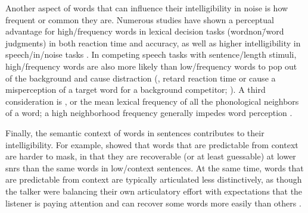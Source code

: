 Another aspect of words that can influence their intelligibility in noise is how frequent or common they are.  Numerous studies have shown a perceptual advantage for high\-/frequency words in lexical decision tasks (word\slsh non\=/word judgments) in both reaction time and accuracy, as well as higher intelligibility in speech\-/in\-/noise tasks \citep[\eg,][]{Howes1957, Savin1963, VitevitchLuce1998, DirksEtAl2001, TakayanagiEtAl2002, VitevitchRodriguez2005}.  In competing speech tasks with sentence\-/length stimuli, high\-/frequency words are also more likely than low\-/frequency words to pop out of the background and cause distraction (\ie, retard reaction time or cause a misperception of a target word for a background competitor; \citealt{BoulengerEtAl2010}).  A third consideration is , or the mean lexical frequency of all the phonological neighbors of a word; a high neighborhood frequency generally impedes word perception \citep{LucePisoni1998}.  

Finally, the semantic context of words in sentences contributes to their intelligibility.  For example, \citet{LewisEtAl1988} showed that words that are predictable from context are harder to mask, in that they are recoverable (or at least guessable) at lower \ac{snr}s than the same words in low\-/context sentences.  At the same time, words that are predictable from context are typically articulated less distinctively, as though the talker were balancing their own articulatory effort with expectations that the listener is paying attention and can recover some words more easily than others \citep{Lindblom1990, Wright2004a}.




